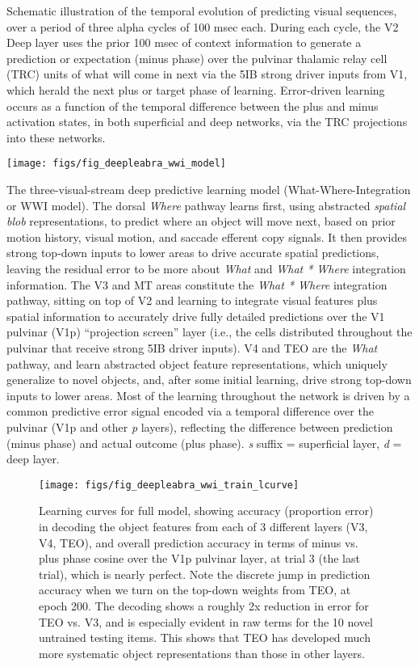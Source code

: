 \documentclass[12pt,twoside]{article}
\newif\myifpdf
\begin{document}
Schematic illustration of the temporal evolution of predicting visual sequences, over a period of three alpha cycles of 100 msec each.  During each cycle, the V2 Deep layer uses the prior 100 msec of context information to generate a prediction or expectation (minus phase) over the pulvinar thalamic relay cell (TRC) units of what will come in next via the 5IB strong driver inputs from V1, which herald the next plus or target phase of learning.  Error-driven learning occurs as a function of the temporal difference between the plus and minus activation states, in both superficial and deep networks, via the TRC projections into these networks.


{\centering\texttt{[image: figs/fig\_deepleabra\_wwi\_model]}\\}

The three-visual-stream deep predictive learning model (What-Where-Integration or WWI model). The dorsal {\em Where} pathway learns first, using abstracted {\em spatial blob} representations, to predict where an object will move next, based on prior motion history, visual motion, and saccade efferent copy signals.  It then provides strong top-down inputs to lower areas to drive accurate spatial predictions, leaving the residual error to be more about {\em What} and {\em What * Where} integration information.  The V3 and MT areas constitute the {\em What * Where} integration pathway, sitting on top of V2 and learning to integrate visual features plus spatial information to accurately drive fully detailed predictions over the V1 pulvinar (V1p) ``projection screen'' layer (i.e., the cells distributed throughout the pulvinar that receive strong 5IB driver inputs).  V4 and TEO are the {\em What} pathway, and learn abstracted object feature representations, which uniquely generalize to novel objects, and, after some initial learning, drive strong top-down inputs to lower areas.  Most of the learning throughout the network is driven by a common predictive error signal encoded via a temporal difference over the pulvinar (V1p and other {\em p} layers), reflecting the difference between prediction (minus phase) and actual outcome (plus phase). {\em s} suffix = superficial  layer, {\em d} = deep layer.


\begin{SCfigure}[50][b]
\texttt{[image: figs/fig\_deepleabra\_wwi\_train\_lcurve]}
\caption{Learning curves for full model, showing accuracy (proportion error) in decoding the object features from each of 3 different layers (V3, V4, TEO), and overall prediction accuracy in terms of minus vs. plus phase cosine over the V1p pulvinar layer, at trial 3 (the last trial), which is nearly perfect.  Note the discrete jump in prediction accuracy when we turn on the top-down weights from TEO, at epoch 200.  The decoding shows a roughly 2x reduction in error for TEO vs. V3, and is especially evident in raw terms for the 10 novel untrained testing items.   This shows that TEO has developed much more systematic object representations than those in other layers.}
\end{SCfigure}


\end{document}

